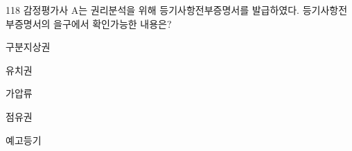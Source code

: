 \begin{question}{118}
감정평가사 A는 권리분석을 위해 등기사항전부증명서를 발급하였다. 등기사항전부증명서의 을구에서 확인가능한 내용은?
\begin{choices}
  \item 구분지상권
  \item 유치권
  \item 가압류
  \item 점유권
  \item 예고등기
\end{choices}
\end{question}
